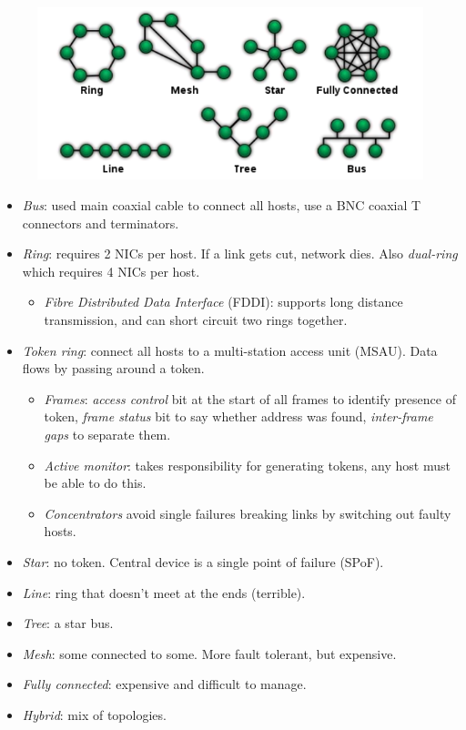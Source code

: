 \documentclass[twocolumn,english]{article}
\begin{document}
\begin{figure}[H]
\centering{}\includegraphics[width=0.5\linewidth]{img/network-topologies}
\end{figure}
\begin{itemize}
\item \emph{Bus}: used main coaxial cable to connect all hosts, use a BNC
coaxial T connectors and terminators. 
\item \emph{Ring}: requires 2 NICs per host. If a link gets cut, network
dies. Also \emph{dual-ring} which requires 4 NICs per host.
\begin{itemize}
\item \emph{Fibre Distributed Data Interface} (FDDI): supports long distance
transmission, and can short circuit two rings together.
\end{itemize}
\item \emph{Token ring}: connect all hosts to a multi-station access unit
(MSAU). Data flows by passing around a token.
\begin{itemize}
\item \emph{Frames}: \emph{access control} bit at the start of all frames
to identify presence of token, \emph{frame status} bit to say whether
address was found, \emph{inter-frame gaps} to separate them.
\item \emph{Active monitor}: takes responsibility for generating tokens,
any host must be able to do this.
\item \emph{Concentrators} avoid single failures breaking links by switching
out faulty hosts.
\end{itemize}
\item \emph{Star}: no token. Central device is a single point of failure
(SPoF).
\item \emph{Line}: ring that doesn't meet at the ends (terrible).
\item \emph{Tree}: a star bus.
\item \emph{Mesh}: some connected to some. More fault tolerant, but expensive.
\item \emph{Fully connected}: expensive and difficult to manage.
\item \emph{Hybrid}: mix of topologies.
\end{itemize}
\end{document}
